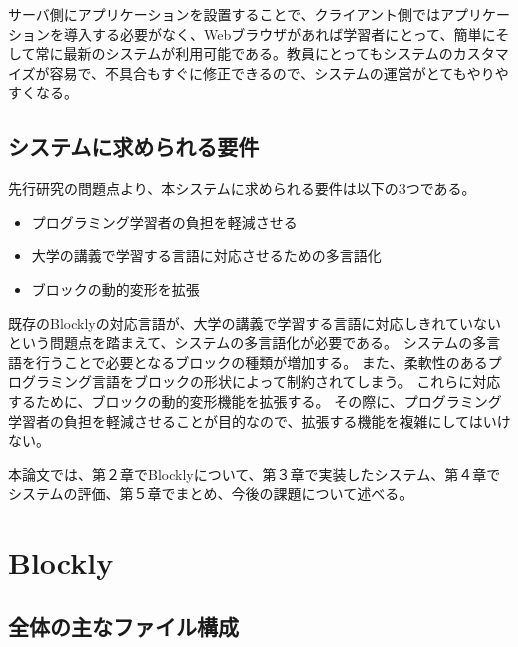 \documentclass{eniepaper}
\begin{document}
サーバ側にアプリケーションを設置することで、クライアント側ではアプリケーションを導入する必要がなく、Webブラウザがあれば学習者にとって、簡単にそして常に最新のシステムが利用可能である。教員にとってもシステムのカスタマイズが容易で、不具合もすぐに修正できるので、システムの運営がとてもやりやすくなる。
 
 \newpage
 
    \section{システムに求められる要件}
    
先行研究の問題点より、本システムに求められる要件は以下の3つである。
 
\begin{itemize}
\item プログラミング学習者の負担を軽減させる
\item 大学の講義で学習する言語に対応させるための多言語化
\item ブロックの動的変形を拡張
\end{itemize} 

既存のBlocklyの対応言語が、大学の講義で学習する言語に対応しきれていないという問題点を踏まえて、システムの多言語化が必要である。
システムの多言語を行うことで必要となるブロックの種類が増加する。
また、柔軟性のあるプログラミング言語をブロックの形状によって制約されてしまう。
これらに対応するために、ブロックの動的変形機能を拡張する。
その際に、プログラミング学習者の負担を軽減させることが目的なので、拡張する機能を複雑にしてはいけない。

本論文では、第２章でBlocklyについて、第３章で実装したシステム、第４章でシステムの評価、第５章でまとめ、今後の課題について述べる。



   \chapter{Blockly}
   
   \section{全体の主なファイル構成}
   
\end{document}
